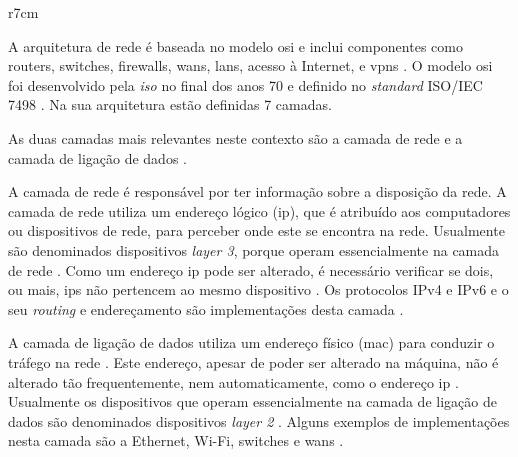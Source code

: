 \documentclass[
  oneside,
  11pt, a4paper,
  footinclude=true,
  headinclude=true,
  cleardoublepage=empty
]{scrbook}
\begin{document}
\begin{wraptable}{r}{7cm}
\vspace{-1cm}
\caption{Camadas do modelo \gls{osi}.}
\label{tab:osi}
\end{wraptable} 
A arquitetura de rede é baseada no modelo \gls{osi} e inclui componentes como routers, switches, firewalls, \glspl{wan}, \glspl{lan}, acesso à Internet, e \glspl{vpn} \cite{infrastructure}. O modelo \gls{osi} foi desenvolvido pela \textit{\acrlong{iso}} \cite{iso} no final dos anos 70 e definido no \textit{standard} ISO/IEC 7498 \cite{iso7498}. Na sua arquitetura estão definidas 7 camadas. 

As duas camadas mais relevantes neste contexto são a camada de rede e a camada de ligação de dados \cite{bearden2013network}.

A camada de rede é responsável por ter informação sobre a disposição da rede. A camada de rede utiliza um endereço lógico (\gls{ip}), que é atribuído aos computadores ou dispositivos de rede, para perceber onde este se encontra na rede. Usualmente são denominados dispositivos \textit{layer 3}, porque operam essencialmente na camada de rede \cite{bearden2013network}. Como um endereço \gls{ip} pode ser alterado, é necessário verificar se dois, ou mais, \glspl{ip} não pertencem ao mesmo dispositivo \citep{lin2019multi}. Os protocolos IPv4 e IPv6 e o seu \textit{routing} e endereçamento são implementações desta camada \cite{infrastructure}.

A camada de ligação de dados utiliza um endereço físico (\gls{mac}) para conduzir o tráfego na rede \cite{osimodel}. Este endereço, apesar de poder ser alterado na máquina, não é alterado tão frequentemente, nem automaticamente, como o endereço \gls{ip} \citep{lin2019multi}. Usualmente os dispositivos que operam essencialmente na camada de ligação de dados são denominados dispositivos \textit{layer 2} \cite{bearden2013network}. Alguns exemplos de implementações nesta camada são a Ethernet, Wi-Fi, switches e \glspl{wan} \cite{infrastructure}.
\end{document}

